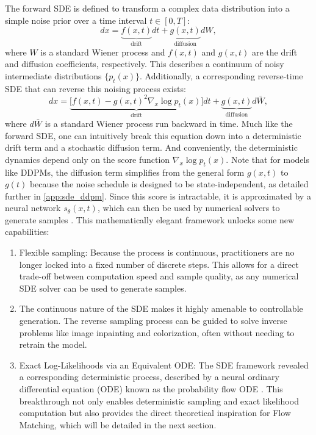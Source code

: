 The forward SDE is defined to transform a complex data distribution into a simple noise prior over a time interval $t \in [0, T]$:
\begin{equation}
	dx = \underbrace{f(x,t)}_{\text{drift}} dt + \underbrace{g(x,t)}_{\text{diffusion}} dW,
\end{equation}
where $W$ is a standard Wiener process and $f(x,t)$ and $g(x,t)$ are the drift and diffusion coefficients, respectively. This describes a continuum of noisy intermediate distributions $\{p_t(x)\}$. Additionally, a corresponding reverse-time SDE that can reverse this noising process exists:
\begin{equation}
\label{eq:reverse_time_sde}
	dx = \underbrace{\big[f(x, t) - g(x,t)^2 \nabla_x \log p_t(x)\big]}_{\text{drift}} dt + \underbrace{g(x,t)}_{\text{diffusion}} d\bar{W},
\end{equation}
where $d\bar{W}$ is a standard Wiener process run backward in time. Much like the forward SDE, one can intuitively break this equation down into a deterministic drift term and a stochastic diffusion term. And conveniently, the deterministic dynamics depend only on the score function $\nabla_x \log p_t(x)$. Note that for models like DDPMs, the diffusion term simplifies from the general form $g(x,t)$ to $g(t)$ because the noise schedule is designed to be state-independent, as detailed further in \ref{app:sde_ddpm}.
Since this score is intractable, it is approximated by a neural network $s_\theta(x,t)$, which can then be used by numerical solvers to generate samples \cite{holderriethIntroductionFlowMatching2025}. This mathematically elegant framework unlocks some new capabilities:
\begin{enumerate}
	\item Flexible sampling: Because the process is continuous, practitioners are no longer locked into a fixed number of discrete steps. This allows for a direct trade-off between computation speed and sample quality, as any numerical SDE solver can be used to generate samples.
	\item The continuous nature of the SDE makes it highly amenable to controllable generation. The reverse sampling process can be guided to solve inverse problems like image inpainting and colorization, often without needing to retrain the model.
	\item Exact Log-Likelihoods via an Equivalent ODE: The SDE framework revealed a corresponding deterministic process, described by a neural ordinary differential equation (ODE) known as the probability flow ODE \cite{papamakariosNormalizingFlowsProbabilistic}. This breakthrough not only enables deterministic sampling and exact likelihood computation but also provides the direct theoretical inspiration for Flow Matching, which will be detailed in the next section.
\end{enumerate}


